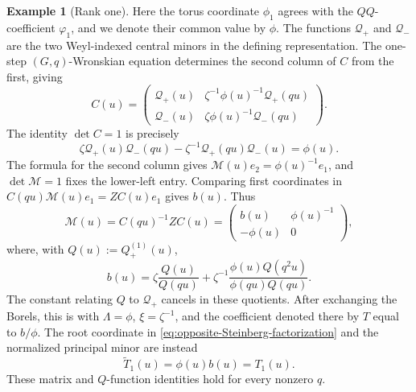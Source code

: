 \documentclass[11pt,leqno]{amsart}
\numberwithin{equation}{section}
\theoremstyle{plain}
\theoremstyle{definition}
\theoremstyle{plain}
\theoremstyle{definition}
\newtheorem{example}[theorem]{Example}
\theoremstyle{remark}
\begin{document}
\begin{example}[Rank one]
Here the torus coordinate $\phi_1$ agrees with the $QQ$-coefficient $\varphi_1$, and we denote their common value by $\phi$. The functions $\mathcal Q_+$ and $\mathcal Q_-$ are the two Weyl-indexed central minors in the defining representation.  The one-step $(G,q)$-Wronskian equation determines the second column of $C$ from the first, giving
\begin{equation}\label{eq:sl2-W-final}
 C(u)=
 \begin{pmatrix}
 \mathcal Q_+(u)&\zeta^{-1}\phi(u)^{-1}\mathcal Q_+(qu)\\[1mm]
 \mathcal Q_-(u)&\zeta\phi(u)^{-1}\mathcal Q_-(qu)
 \end{pmatrix}.
\end{equation}
The identity $\det C=1$ is precisely
\begin{equation}\label{eq:sl2-QQ-factor}
 \zeta\mathcal Q_+(u)\mathcal Q_-(qu)
 -\zeta^{-1}\mathcal Q_+(qu)\mathcal Q_-(u)=\phi(u).
\end{equation}
The formula for the second column gives $\mathscr M(u)e_2=\phi(u)^{-1}e_1$, and $\det\mathscr M=1$ fixes the lower-left entry. Comparing first coordinates in $C(qu)\mathscr M(u)e_1=ZC(u)e_1$ gives $b(u)$. Thus
\begin{equation}\label{eq:sl2-BW-direct}
 \mathscr M(u)=C(qu)^{-1}ZC(u)
   =\begin{pmatrix}b(u)&\phi(u)^{-1}\\-\phi(u)&0\end{pmatrix},
\end{equation}
where, with $Q(u):=Q_+^{(1)}(u)$,
\begin{equation}\label{eq:sl2-b-Wronskian-frame}
 b(u)=\zeta\frac{Q(u)}{Q(qu)}
   +\zeta^{-1}\frac{\phi(u)Q(q^2u)}{\phi(qu)Q(qu)}.
\end{equation}
The constant relating $Q$ to $\mathcal Q_+$ cancels in these quotients.  After exchanging the Borels, this is \cite[(8.4)]{FKSZ2020} with $\Lambda=\phi$, $\xi=\zeta^{-1}$, and the coefficient denoted there by $T$ equal to $b/\phi$.  The root coordinate in \eqref{eq:opposite-Steinberg-factorization} and the normalized principal minor are instead
\begin{equation}\label{eq:sl2-weighted-coordinate-conversion}
 \widetilde T_1(u)=\phi(u)b(u)=T_1(u).
\end{equation}
These matrix and $Q$-function identities hold for every nonzero $q$.


\end{example}
\end{document}

